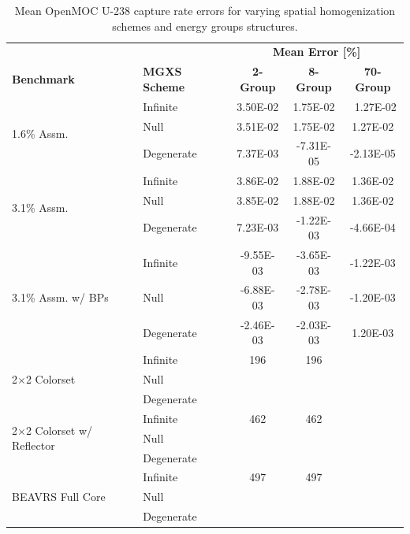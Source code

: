 \begin{table}[h!]
  \centering
  \caption[Mean OpenMOC U-238 capture rate errors]{Mean OpenMOC U-238 capture rate errors for varying spatial homogenization schemes and energy groups structures.}
  \small
  \label{table:chap8-openmoc-mean-capt-rates}
  \vspace{6pt}
  \begin{tabular}{l l c c c}
  \toprule
  \rowcolor{lightgray}
  & & \multicolumn{3}{c}{\cellcolor{lightgray} \textbf{Mean Error [\%]}} \\
  \multirow{-2}{*}{\cellcolor{lightgray} \bf Benchmark} &
  \multirow{-2}{*}{\cellcolor{lightgray} \bf \ac{MGXS} Scheme} &
  {\cellcolor{lightgray} \bf 2-Group} &
  {\cellcolor{lightgray} \bf 8-Group} &
  {\cellcolor{lightgray} \bf 70-Group} \\
  \midrule
\multirow{3}{*}{\parbox{2.5cm}{1.6\% Assm.}} & Infinite & 3.50E-02 & 1.75E-02 &\
 1.27E-02 \\
& Null & 3.51E-02 & 1.75E-02 & 1.27E-02 \\
& Degenerate & 7.37E-03 & -7.31E-05 & -2.13E-05 \\
  \midrule
\multirow{3}{*}{\parbox{2.5cm}{3.1\% Assm.}} & Infinite & 3.86E-02 & 1.88E-02 & 1.36E-02 \\
& Null & 3.85E-02 & 1.88E-02 & 1.36E-02 \\
& Degenerate & 7.23E-03 & -1.22E-03 & -4.66E-04 \\
  \midrule
\multirow{3}{*}{\parbox{2.5cm}{3.1\% Assm. w/ \acp{BP}}} & Infinite & -9.55E-03 & -3.65E-03 & -1.22E-03 \\
& Null & -6.88E-03 & -2.78E-03 & -1.20E-03 \\
& Degenerate & -2.46E-03 & -2.03E-03 & 1.20E-03 \\
  \midrule
  \multirow{3}{*}{\parbox{2.5cm}{2$\times$2 Colorset}} & Infinite & 196 & 196 & \\
  & Null & & & \\
  & Degenerate & & & \\
  \midrule
  \multirow{3}{*}{\parbox{2.3cm}{2$\times$2 Colorset w/ Reflector}} & Infinite & 462 & 462 & \\
  & Null & & & \\
  & Degenerate & & & \\
  \midrule
  \multirow{3}{*}{\parbox{2cm}{\ac{BEAVRS} Full Core}} & Infinite & 497 & 497 & \\
  & Null & & & \\
  & Degenerate & & & \\
  \bottomrule
\end{tabular}
\end{table}



